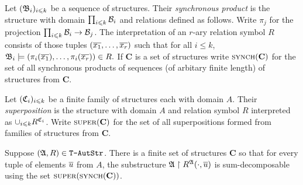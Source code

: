\begin{definition}
Let $(\mathfrak{B}_i)_{i \leqslant k}$ be a sequence of structures.
Their {\em synchronous product} is the structure with domain $\prod_{i \leqslant k} {\mathcal B}_i$ and relations defined as follows.
Write $\pi_j$ for the projection $\prod_{i \leqslant k} {\mathcal B}_i \to {\mathcal B}_j$. 
The interpretation of an $r$-ary relation symbol $R$
consists of those tuples $(\mbox{$\overline {x_1}$},\dots,\mbox{$\overline {x_r}$})$ such that for all $i \leq k$, 
$\mathfrak{B}_i \models (\pi_i(\mbox{$\overline {x_1}$}),\dots,\pi_i(\mbox{$\overline {x_r}$})) \in R.$
If $\mathbf{C}$ is a set of structures write $\textsc{synch}(\mathbf{C})$ for the set of all
synchronous products of sequences (of arbitary finite length) of structures from $\mathbf{C}$.

Let $(\mathfrak{C}_i)_{i \leqslant k}$ be a finite family of structures each with domain $A$.
Their {\em superposition} is the structure with domain $A$ and relation symbol $R$ interpreted as $\cup_{i \leqslant k} R^{\mathfrak{C}_i}$.
Write $\textsc{super}(\mathbf{C})$ for the set of all superpositions formed from families of structures from $\mathbf{C}$.
\end{definition}

\begin{theorem} \label{AS:thm:treeautdecomp}
Suppose $(\mathfrak{A},R) \in \mbox{\tt T-AutStr}$.
There is a finite set of structures $\mathbf{C}$ so that for every tuple of elements $\mbox{$\overline {u}$}$ from $A$, the
substructure ${\mathfrak{A}} \restriction R^{\mathfrak{A}}(\cdot,\mbox{$\overline {u}$})$ is sum-decomposable using the set $\textsc{super}(\textsc{synch}(\textbf{C}))$.
\end{theorem}

